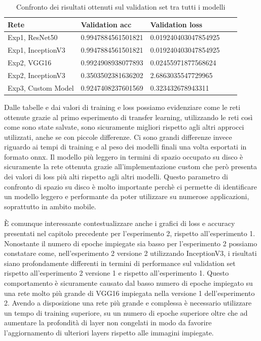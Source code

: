 \begin{table}[H]
    \begin{tabular}{|l|l|l|l|l|}
    \hline
    \textbf{Rete}                         &  \textbf{Validation acc} & \textbf{Validation loss}    \\ \hline
    Exp1, ResNet50      & 0.9947884561501821    & 0.019240403047854925 \\ \hline
    Exp1, InceptionV3  & 0.9947884561501821    & 0.019240403047854925 \\ \hline
    Exp2, VGG16        & 0.9924908938077893    & 0.02455971877568624  \\ \hline
    Exp2, InceptionV3 & 0.3503502381636202    & 2.6863035547729965   \\ \hline
    Exp3, Custom Model  & 0.9247408237601569    & 0.323432678943311    \\ \hline
    \end{tabular}
    \caption{\label{tab:confronto_risultati_loss}Confronto dei risultati ottenuti sul validation set tra tutti i modelli}
\end{table}

Dalle tabelle e dai valori di training e loss possiamo evidenziare come le reti ottenute grazie al primo esperimento di transfer learning, utilizzando le reti così come sono state salvate, sono sicuramente migliori rispetto agli altri approcci utilizzati, anche se con piccole differenze.
Ci sono grandi differenze invece riguardo ai tempi di training e al peso dei modelli finali una volta esportati in formato onnx.  
Il modello più leggero in termini di spazio occupato su disco è sicuramente la rete ottenuta grazie all'implementazione custom che però presenta dei valori di loss più alti rispetto agli altri modelli.
Questo parametro di confronto di spazio su disco è molto importante perchè ci permette di identificare un modello leggero e performante da poter utilizzare su numerose applicazioni, soprattutto in ambito mobile.  \bigskip

È comunque interessante contestualizzare anche i grafici di loss e accuracy presentati nel capitolo precedente per l'esperimento 2, rispetto all'esperimento 1.  
Nonostante il numero di epoche impiegate sia basso per l'esperimento 2 possiamo constatare come, nell'esperimento 2 versione 2 utilizzando InceptionV3, i risultati siano profondamente differenti in termini di performance sul validation set rispetto all'esperimento 2 versione 1 e rispetto all'esperimento 1.  
Questo comportamento è sicuramente causato dal basso numero di epoche impiegato su una rete molto più grande di VGG16 impiegata nella versione 1 dell'esperimento 2.
Avendo a disposizione una rete più grande e complessa è necessario utilizzare un tempo di training superiore, su un numero di epoche superiore oltre che ad aumentare la profondità di layer non congelati in modo da favorire l'aggiornamento di ulteriori layers rispetto alle immagini impiegate. \bigskip

